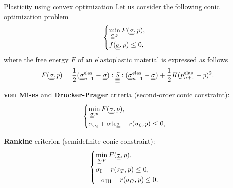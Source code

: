 \documentclass[9pt]{beamer}
\begin{document}
\begin{frame}{Plasticity using convex optimization}
  Let us consider the following conic optimization problem
  \begin{equation}
      \label{eqn:conic_problem}
      \begin{cases}
          \min\limits_{\underline{\underline{\sigma}}, p} F(\underline{\underline{\sigma}}, p), \\
          f(\underline{\underline{\sigma}}, p) \leq 0,
      \end{cases}
  \end{equation}
  where the free energy $F$ of an elastoplastic material is expressed as follows
  \begin{equation}
      F(\underline{\underline{\sigma}}, p) = \frac{1}{2}(\underline{\underline{\sigma}}_{n+1}^{\text{elas}} - \underline{\underline{\sigma}}) : \underline{\underline{\underline{\underline{S}}}} : (\underline{\underline{\sigma}}_{n+1}^{\text{elas}} - \underline{\underline{\sigma}}) + \frac{1}{2}H(p_{n+1}^\text{elas} - p)^2.
  \end{equation}

  \textbf{von Mises} and \textbf{Drucker-Prager} criteria (second-order conic constraint): 
  \begin{equation}
      \begin{cases}
          \min\limits_{\underline{\underline{\sigma}}, p} F(\underline{\underline{\sigma}}, p), \\
          \sigma_\text{eq} + \alpha\mathrm{tr}\underline{\underline{\sigma}} - r(\sigma_0, p) \leq 0,
      \end{cases}
  \end{equation}

  \textbf{Rankine} criterion (semidefinite conic constraint):
  \begin{equation}
      \begin{cases}
          \min\limits_{\underline{\underline{\sigma}}, p} F(\underline{\underline{\sigma}}, p), \\
          \sigma_\text{I} - r(\sigma_T, p) \leq 0, \\
          -\sigma_\text{III} - r(\sigma_C, p) \leq 0.    
      \end{cases}
  \end{equation}
\end{frame}
\end{document}
